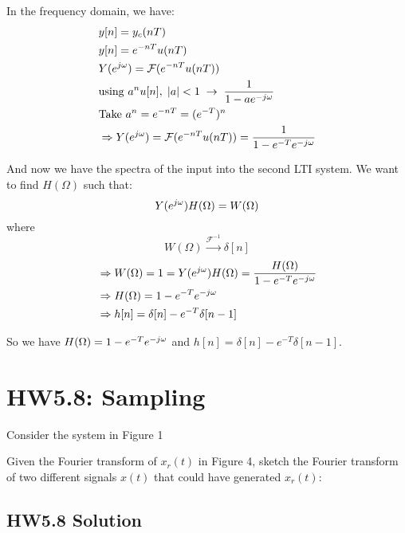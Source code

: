 \documentclass[11pt, fleqn]{article}
\begin{document}
In the frequency domain, we have:
\begin{align*}
    &y[n] = y_c(nT) \\
    &y[n] = e^{-nT}u(nT) \\
    &Y(e^{j\omega}) = \mathcal{F}(e^{-nT}u(nT)) \\
    &\text{using   } a^nu[n], \hspace*{1mm} |a|<1 \hspace*{1mm} \rightarrow \hspace*{1mm} \frac{1}{1 - ae^{-j\omega}} \\
    &\text{Take } a^n = e^{-nT} = (e^{-T})^n \\
    &\Rightarrow Y(e^{j\omega}) = \mathcal{F}(e^{-nT}u(nT)) = \frac{1}{1 - e^{-T}e^{-j\omega}}
\end{align*}

And now we have the spectra of the input into the second LTI system. We want to find $H(\Omega)$ such that:
$$
    Y(e^{j\omega})H(\Omega) = W(\Omega)
$$
where
$$
W(\Omega) \xrightarrow{\mathcal{F}^{-1}} \delta[n]
$$
\begin{align*}
    & \Rightarrow W(\Omega) = 1 = Y(e^{j\omega})H(\Omega) = \frac{H(\Omega)}{1 - e^{-T}e^{-j\omega}} \\
    &\Rightarrow H(\Omega) = 1 - e^{-T}e^{-j\omega} \\
    &\Rightarrow h[n] = \delta[n] - e^{-T}\delta[n-1]
\end{align*}

\vspace*{2mm}

So we have $H(\Omega) = 1 - e^{-T}e^{-j\omega}$ and $h[n] = \delta[n] - e^{-T}\delta[n-1]$.

\pagebreak

\section*{HW5.8: Sampling}

Consider the system in Figure 1

\image[q5.81.PNG]{}

Given the Fourier transform of $ x_r(t) $
in Figure 4, sketch the Fourier transform of two different signals $ x(t) $ that could have generated $ x_r(t) $:

\image[q5.82.PNG]{}

\subsection*{HW5.8 Solution}
\end{document}
